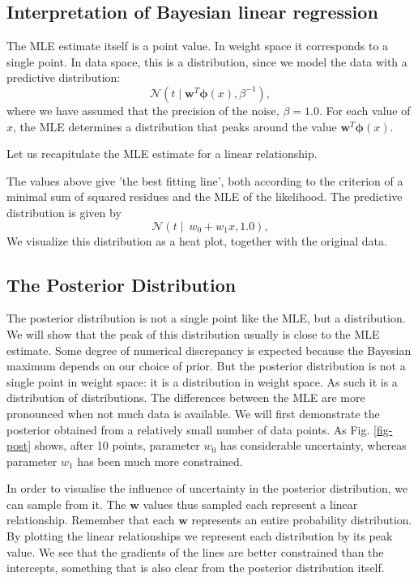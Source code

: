 \subsection{Interpretation of Bayesian linear regression}


The MLE estimate itself is a point value. In weight space it corresponds to a single point. In data space, this is
a distribution, since we model the data with a predictive distribution:
$$
 \mathcal{N}(t \mid \boldsymbol{w}^T \boldsymbol{\phi}(x), \beta^{-1}),
$$
where we have assumed that the precision of the noise, $\beta = 1.0$.
For each value of $x$, the MLE determines a distribution that peaks around the value 
$\boldsymbol{w}^T \boldsymbol{\phi}(x)$.

Let us recapitulate the MLE estimate for a linear relationship.

The values above give 'the best fitting line', both according to the criterion of a minimal sum of squared
residues and the MLE of the likelihood. The predictive distribution is given by
$$
 \mathcal{N}(t \mid \ w_0 + w_1x, 1.0),
$$
We visualize this distribution as a heat plot, together with the original data.



\subsection{The Posterior Distribution}

The posterior distribution is not a single point like the MLE, but a distribution. We will show that the peak of this distribution  usually is close to the MLE estimate.
Some degree of numerical discrepancy is expected because the Bayesian maximum depends on our choice of prior. But the posterior distribution is not a
single point in weight space: it is a distribution in weight space. As such it is a distribution of distributions.
The differences between the MLE are more pronounced when not much data is available. We will first demonstrate the posterior obtained from a relatively small number of data points. As Fig. \ref{fig-post} shows, after 10 points, parameter $w_0$ has considerable uncertainty, whereas parameter $w_1$ has been much more constrained.

In order to visualise the influence of uncertainty in the posterior distribution, we can sample from it.
The $\boldsymbol{w}$ values thus sampled each represent a linear relationship.
Remember that each $\boldsymbol{w}$ represents an entire probability distribution.
By plotting the linear relationships we represent each distribution by its peak value. We see
that the gradients of the lines are better constrained than the intercepts, something that is also clear from
the posterior distribution itself.


